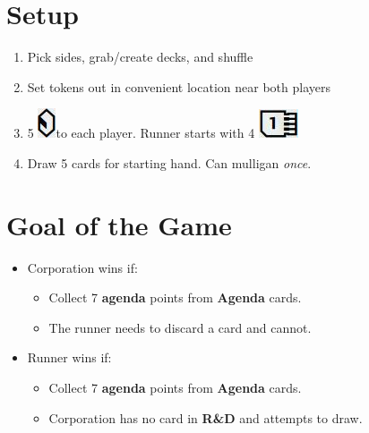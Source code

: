 \documentclass[12pt]{article}
\newenvironment{enumerateCustom}
{\begin{enumerate}
  \setlength{\itemsep}{1pt}
  \setlength{\parskip}{0pt}
  \setlength{\parsep}{0pt}}
{\end{enumerate}}
\newenvironment{itemizeCustom}
{\begin{itemize}
  \setlength{\itemsep}{1pt}
  \setlength{\parskip}{0pt}
  \setlength{\parsep}{0pt}}
{\end{itemize}}
\newcommand{\credit}{\includegraphics[scale=0.40]{images/creditLarge.jpg}\hspace{0.3em}}
\newcommand{\memoryUnitNoSpace}{\includegraphics[scale=0.40]{images/memoryUnitLarge.jpg}}
\begin{document}
\renewcommand{\labelenumi}{\arabic{enumi}.}
\renewcommand{\labelenumii}{\arabic{enumi}.\arabic{enumii}.}

\begin{multicols*}{2}

\section*{Setup}
\begin{enumerateCustom}
	\item Pick sides, grab/create decks, and shuffle
	\item Set tokens out in convenient location near both players
	\item 5 \credit to each player. Runner starts with 4 \memoryUnitNoSpace
	\item Draw 5 cards for starting hand. Can mulligan \emph{once}.
\end{enumerateCustom}

\section*{Goal of the Game}
\begin{itemizeCustom}
	\item Corporation wins if:
		\begin{itemizeCustom}
			\item Collect 7 \textbf{agenda} points from \textbf{Agenda} cards.
			\item The runner needs to discard a card and cannot.
		\end{itemizeCustom}
	\item Runner wins if:
		\begin{itemizeCustom}
			\item Collect 7 \textbf{agenda} points from \textbf{Agenda} cards.
			\item Corporation has no card in \textbf{R\&D} and attempts to draw.
		\end{itemizeCustom}
\end{itemizeCustom}


\end{multicols*}
\end{document}
